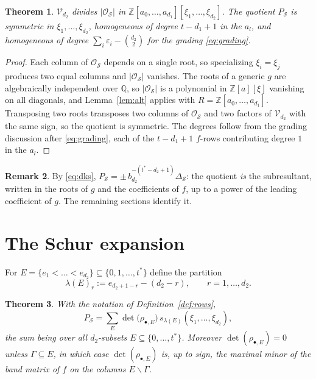 \documentclass[11pt,reqno]{amsart}
\theoremstyle{plain}
\newtheorem{theorem}{Theorem}[section]
\theoremstyle{definition}
\newtheorem{remark}[theorem]{Remark}
\newcommand{\cO}{\mathcal{O}}
\newcommand{\cS}{\mathcal{S}}
\newcommand{\cV}{\mathcal{V}}
\newcommand{\ZZ}{\mathbb{Z}}
\newcommand{\QQ}{\mathbb{Q}}
\begin{document}
\begin{theorem}\label{thm:div}
$\cV_{d_2}$ divides $|\cO_\cS|$ in $\ZZ[a_0,\dots,a_{d_1}][\xi_1,\dots,\xi_{d_2}]$.
The quotient $P_\cS$ is symmetric in $\xi_1,\dots,\xi_{d_2}$, homogeneous of degree
$t-d_1+1$ in the $a_l$, and homogeneous of degree
$\sum_i\varepsilon_i-\binom{d_2}{2}$ for the grading \eqref{eq:grading}.
\end{theorem}

\begin{proof}
Each column of $\cO_\cS$ depends on a single root, so specializing $\xi_i=\xi_j$
produces two equal columns and $|\cO_\cS|$ vanishes. The roots of a generic $g$
are algebraically independent over $\QQ$, so $|\cO_\cS|$ is a polynomial in
$\ZZ[a][\xi]$ vanishing on all diagonals, and Lemma~\ref{lem:alt} applies with
$R=\ZZ[a_0,\dots,a_{d_1}]$. Transposing two roots transposes two columns of
$\cO_\cS$ and two factors of $\cV_{d_2}$ with the same sign, so the quotient is
symmetric. The degrees follow from the grading discussion after
\eqref{eq:grading}, each of the $t-d_1+1$ $f$-rows contributing degree $1$ in
the $a_l$.
\end{proof}

\begin{remark}
By \eqref{eq:dks}, $P_\cS=\pm\,b_{d_2}^{-(t^*-d_2+1)}\Delta_\cS$: the quotient
\emph{is} the subresultant, written in the roots of $g$ and the coefficients of
$f$, up to a power of the leading coefficient of $g$. The remaining sections
identify it.
\end{remark}

\section{The Schur expansion}\label{sec:cb}

For $E=\{e_1<\dots<e_{d_2}\}\subseteq\{0,1,\dots,t^*\}$ define the partition
\begin{equation}\label{eq:lambdaE}
  \lambda(E)_r:=e_{d_2+1-r}-(d_2-r),\qquad r=1,\dots,d_2 .
\end{equation}

\begin{theorem}\label{thm:cb}
With the notation of Definition~\ref{def:rows},
\[
  P_\cS=\sum_{E}\det\big(\rho_{\bullet,E}\big)\, s_{\lambda(E)}(\xi_1,\dots,\xi_{d_2}),
\]
the sum being over all $d_2$-subsets $E\subseteq\{0,\dots,t^*\}$. Moreover
$\det(\rho_{\bullet,E})=0$ unless $\Gamma\subseteq E$, in which case
$\det(\rho_{\bullet,E})$ is, up to sign, the maximal minor of the band matrix of
$f$ on the columns $E\smallsetminus\Gamma$.
\end{theorem}
\end{document}

